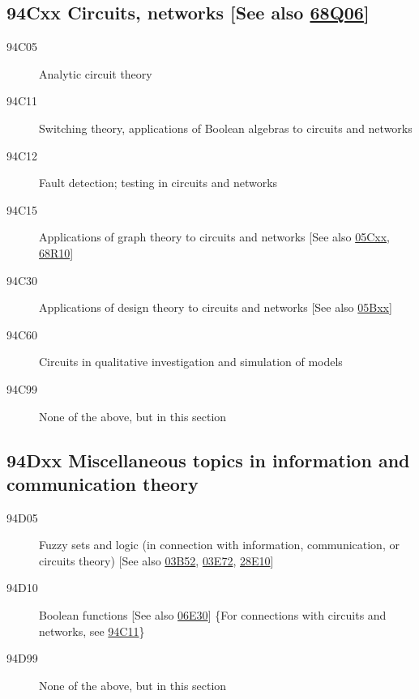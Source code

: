 \documentclass[letterpaper]{article}
\begin{document}
\subsection*{94Cxx  Circuits, networks [See also \hyperref[68Q06]{68Q06}]}\label{94Cxx}
\begin{description}  
\item [94C05]\label{94C05} Analytic circuit theory
\item [94C11]\label{94C11} Switching theory, applications of Boolean algebras to circuits and networks
\item [94C12]\label{94C12} Fault detection; testing in circuits and networks
\item [94C15]\label{94C15} Applications of graph theory to circuits and networks [See also \hyperref[05Cxx]{05Cxx}, \hyperref[68R10]{68R10}]
\item [94C30]\label{94C30} Applications of design theory to circuits and networks [See also \hyperref[05Bxx]{05Bxx}]
\item [94C60]\label{94C60} Circuits in qualitative investigation and simulation of models
\item [94C99]\label{94C99} None of the above, but in this section
\end{description}
\subsection*{94Dxx  Miscellaneous topics in information and communication theory}\label{94Dxx}
\begin{description}  
\item [94D05]\label{94D05} Fuzzy sets and logic (in connection with information, communication, or circuits theory) [See also \hyperref[03B52]{03B52}, \hyperref[03E72]{03E72}, \hyperref[28E10]{28E10}]
\item [94D10]\label{94D10} Boolean functions [See also \hyperref[06E30]{06E30}] \{For connections with circuits and networks, see \hyperref[94C11]{94C11}\}
\item [94D99]\label{94D99} None of the above, but in this section
\end{description}
\end{document}
